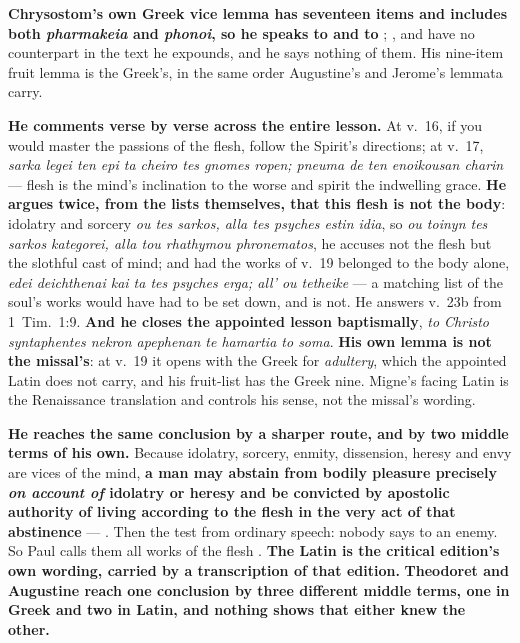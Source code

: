 \textbf{Chrysostom's own Greek vice lemma has seventeen items and includes both
\emph{pharmakeia} and \emph{phonoi}, so he speaks to  and to
}; ,  and  have
no counterpart in the text he expounds, and he says nothing of them. His
nine-item fruit lemma is the Greek's, in the same order Augustine's and
Jerome's lemmata carry.

\begin{witnessnote}
\textbf{He comments verse by verse across the entire lesson.} At v.~16, if you would master
the passions of the flesh, follow the Spirit's directions; at v.~17,
\emph{sarka legei ten epi ta cheiro tes gnomes ropen; pneuma de ten enoikousan
charin} --- flesh is the mind's inclination to the worse and spirit the indwelling
grace. \textbf{He argues twice, from the lists themselves, that this flesh is not
the body}: idolatry and sorcery \emph{ou tes sarkos, alla tes psyches estin
idia}, so \emph{ou toinyn tes sarkos kategorei, alla tou rhathymou phronematos},
he accuses not the flesh but the slothful cast of mind; and had the works of
v.~19 belonged to the body alone, \emph{edei deichthenai kai ta tes psyches
erga; all' ou tetheike} --- a matching list of the soul's works would have had to
be set down, and is not. He answers v.~23b from 1~Tim.\ 1:9. \textbf{And he
closes the appointed lesson baptismally}, \emph{to Christo syntaphentes nekron
apephenan te hamartia to soma}. \textbf{His own lemma is not the missal's}: at
v.~19 it opens with the Greek for \emph{adultery}, which the appointed Latin
does not carry, and his fruit-list has the Greek nine. Migne's facing Latin is
the Renaissance translation and controls his sense, not the missal's wording.
\end{witnessnote}

\begin{witnessnote}
 \textbf{He reaches the same conclusion by a sharper route,
and by two middle terms of his own.} Because idolatry, sorcery, enmity,
dissension, heresy and envy are vices of the mind, \textbf{a man may abstain
from bodily pleasure precisely \emph{on account of} idolatry or heresy and be
convicted by apostolic authority of living according to the flesh in the very
act of that abstinence} --- . Then the test from ordinary
speech: nobody says  to an enemy. So Paul calls them all
works of the flesh . \textbf{The Latin is the critical
edition's own wording, carried by a transcription of that edition.}
\textbf{Theodoret and Augustine reach one conclusion by three different middle
terms, one in Greek and two in Latin, and nothing shows that either knew the
other.}
\end{witnessnote}


